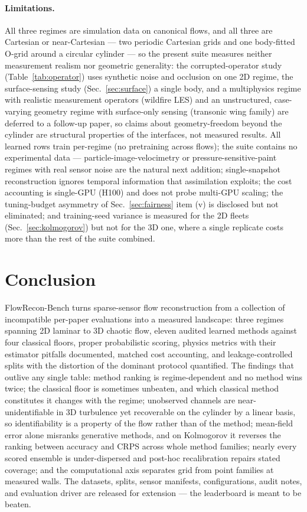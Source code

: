 \documentclass[aip,pof,reprint,amsmath,amssymb,superscriptaddress]{revtex4-1}
\newcommand{\benchname}{FlowRecon-Bench}
\begin{document}
\paragraph{Limitations.} All three regimes are simulation data on
canonical flows, and all three are Cartesian or near-Cartesian --- two
periodic Cartesian grids and one body-fitted O-grid around a circular
cylinder --- so the present suite measures neither measurement realism nor
geometric generality: the corrupted-operator study (Table~\ref{tab:operator})
uses synthetic noise and occlusion on one 2D regime, the surface-sensing study
(Sec.~\ref{sec:surface}) a single body, and a multiphysics regime with
realistic measurement operators (wildfire LES) and an unstructured,
case-varying geometry regime with surface-only sensing (transonic wing family)
are deferred to a follow-up paper, so claims about geometry-freedom beyond the
cylinder are structural properties of the interfaces, not measured results. All learned rows
train per-regime (no pretraining across flows); the suite contains no
experimental data --- particle-image-velocimetry or
pressure-sensitive-paint regimes with real sensor noise are the natural
next addition; single-snapshot reconstruction
ignores temporal information that assimilation exploits; the cost accounting
is single-GPU (H100) and does not probe multi-GPU scaling; the tuning-budget
asymmetry of Sec.~\ref{sec:fairness} item (v) is disclosed but not
eliminated; and training-seed variance is measured for the 2D fleets
(Sec.~\ref{sec:kolmogorov}) but not for the 3D one, where a single replicate
costs more than the rest of the suite combined.

\section{Conclusion}\label{sec:conclusion}

\benchname{} turns sparse-sensor flow reconstruction from a collection of
incompatible per-paper evaluations into a measured landscape: three regimes
spanning 2D laminar to 3D chaotic flow, eleven audited learned methods against
four classical floors, proper probabilistic scoring, physics metrics
with their estimator pitfalls documented, matched cost accounting, and
leakage-controlled splits with the distortion of the dominant protocol
quantified. The findings that outlive any single table: method ranking is
regime-dependent and no method wins twice; the classical floor is sometimes
unbeaten, and which classical method constitutes it changes with the regime;
unobserved channels are near-unidentifiable in 3D turbulence yet recoverable
on the cylinder by a linear basis, so identifiability is a property of the
flow rather than of the method; mean-field error alone misranks generative
methods, and on Kolmogorov it reverses the ranking between accuracy and CRPS
across whole method families; nearly every scored ensemble is under-dispersed
and post-hoc recalibration repairs stated coverage; and the computational axis
separates grid from point families at measured walls. The datasets, splits,
sensor manifests, configurations, audit notes, and evaluation driver are
released for extension --- the leaderboard is meant to be beaten.
\end{document}
